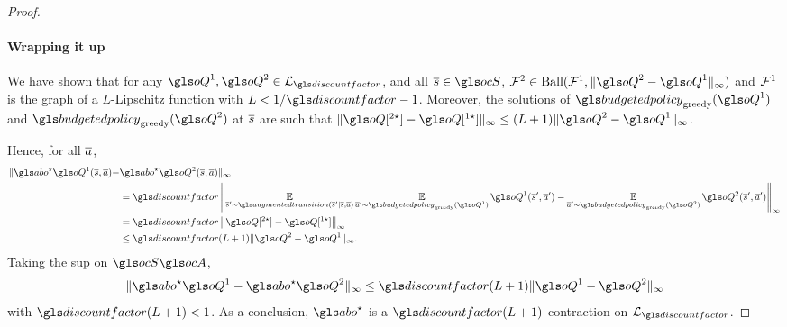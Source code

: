 \begin{subappendices}
\begin{proof}
    \paragraph{Wrapping it up}

    We have shown that for any $\oQ^1,\oQ^2\in\cL_{\discountfactor}$,
    and all $\os\in\ocS$, $\cF^2\in\text{Ball}(\cF^1,\|\oQ^2-\oQ^1\|_\infty)$ and $\mathcal{F}^1$ is
    the graph of a $L$-Lipschitz function with $L<1/\discountfactor - 1$.
    Moreover, the solutions of $\budgetedpolicy_\text{greedy}(\oQ^1)$ and $\budgetedpolicy_\text{greedy}(\oQ^2)$ at
    $\overline{s}$ are such that $ \|\oQ[^{2\star}] - \oQ[^{1\star}]\|_\infty \leq (L+1)\|\oQ^2-\oQ^1\|_\infty$.

    Hence, for all $\overline{a}$,
    \begin{align*}
        \|\abo^{\star}\oQ^1(\os, \oa) - &\abo^{\star}\oQ^2(\os, \oa)\|_\infty \\
        &= \discountfactor\left\|\expectedvalueover{\os'\sim\augmentedtransition(\os'|\os,\oa)}
        \expectedvalueover{\oa'\sim\budgetedpolicy_\text{greedy}(\oQ^1)}\oQ^1(\os',\oa') -
        \expectedvalueover{\oa'\sim\budgetedpolicy_\text{greedy}(\oQ^2)}\oQ^2(\os',\oa')\right\|_\infty \\
        &= \discountfactor\left\|\oQ[^{2\star}] - \oQ[^{1\star}]\right\|_\infty \\
        &\leq \discountfactor(L+1)\|\oQ^2-\oQ^1\|_\infty.
    \end{align*}
    Taking the sup on $\ocS\ocA$,
    \begin{equation*}
        \|\abo^{\star}\oQ^1 - \abo^{\star}\oQ^2\|_\infty \leq \discountfactor(L+1)\|\oQ^1-\oQ^2\|_\infty
    \end{equation*}
    with $\discountfactor(L+1) < 1$.
    As a conclusion, $\abo^{\star}$ is a $\discountfactor(L+1)$-contraction on $\cL_{\discountfactor}$.
\end{proof}






\end{subappendices}
